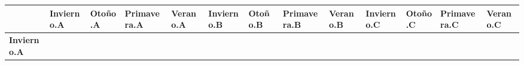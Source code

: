 \documentclass[]{book}
\theoremstyle{definition}
\theoremstyle{definition}
\theoremstyle{definition}
\theoremstyle{remark}
\begin{document}
\begin{longtable}[]{@{}lllllllllllll@{}}
\toprule
\begin{minipage}[b]{0.06\columnwidth}\raggedright
\strut
\end{minipage} & \begin{minipage}[b]{0.05\columnwidth}\raggedright
\textbf{Invierno.A}\strut
\end{minipage} & \begin{minipage}[b]{0.05\columnwidth}\raggedright
\textbf{Otoño.A}\strut
\end{minipage} & \begin{minipage}[b]{0.06\columnwidth}\raggedright
\textbf{Primavera.A}\strut
\end{minipage} & \begin{minipage}[b]{0.05\columnwidth}\raggedright
\textbf{Verano.A}\strut
\end{minipage} & \begin{minipage}[b]{0.05\columnwidth}\raggedright
\textbf{Invierno.B}\strut
\end{minipage} & \begin{minipage}[b]{0.05\columnwidth}\raggedright
\textbf{Otoño.B}\strut
\end{minipage} & \begin{minipage}[b]{0.06\columnwidth}\raggedright
\textbf{Primavera.B}\strut
\end{minipage} & \begin{minipage}[b]{0.05\columnwidth}\raggedright
\textbf{Verano.B}\strut
\end{minipage} & \begin{minipage}[b]{0.05\columnwidth}\raggedright
\textbf{Invierno.C}\strut
\end{minipage} & \begin{minipage}[b]{0.05\columnwidth}\raggedright
\textbf{Otoño.C}\strut
\end{minipage} & \begin{minipage}[b]{0.06\columnwidth}\raggedright
\textbf{Primavera.C}\strut
\end{minipage} & \begin{minipage}[b]{0.05\columnwidth}\raggedright
\textbf{Verano.C}\strut
\end{minipage}\tabularnewline
\midrule
\endhead
\begin{minipage}[t]{0.06\columnwidth}\raggedright
\textbf{Invierno.A}\strut
\end{minipage} & \begin{minipage}[t]{0.05\columnwidth}\raggedright

\end{minipage}
\end{longtable}
\end{document}

